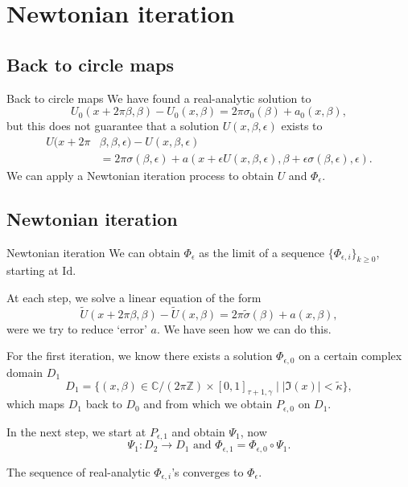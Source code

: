 \documentclass[]{beamer}
\newcommand{\e}{\epsilon}
\newcommand{\be}{\beta}
\newcommand{\g}{\gamma}
\begin{document}
\section{Newtonian iteration}

\subsection{Back to circle maps}

\begin{frame}{Back to circle maps}
    We have found a real-analytic solution to
    \begin{equation*}
        U_0(x + 2 \pi \be,\be) - U_0(x, \be)
        = 2 \pi \sigma_0(\be) + a_0(x, \be),
    \end{equation*}
    but this does not guarantee that a solution $U(x, \be, \e)$ exists to
    \begin{align*}
	    U(x + 2 \pi & \be,\be,\e) - U(x, \be, \e) \\
            & = 2 \pi \sigma(\be, \e) + a(x + \e U(x, \be, \e), \be + \e \sigma(\be, \e), \e).
    \end{align*}
    \pause
    We can apply a Newtonian iteration process to obtain $U$ and $\Phi_\e$.
    
\end{frame}

\subsection{Newtonian iteration}
\begin{frame}{Newtonian iteration}
    We can obtain $\Phi_\e$ as the limit of a sequence $\{ \Phi_{\e,i} \}_{k\ge0}$,
    starting at $\mathrm{Id}$.

\medskip
\pause
    At each step, we solve a linear equation of the form
\begin{equation*}
    \tilde U (x + 2\pi \be, \be) - \tilde U (x,\be) = 2 \pi \tilde \sigma(\be) + a(x, \be),
\end{equation*}
   were we try to reduce `error' $a$. We have seen how we can do this.
\end{frame}

\begin{frame}
    For the first iteration, we know there exists a solution $\Phi_{\e,0}$ on
    a certain complex domain $D_1$
    \begin{equation*}
        D_1 = \{ (x,\be) \in \mathbb{C}/(2 \pi \mathbb{Z}) \times [0,1]_{\tau +1, \g} \mid |\Im(x)| < \tilde \kappa \},
    \end{equation*}
     which maps $D_1$ back to $D_0$ and from which we obtain $P_{\e,0}$ on $D_1$.
     
\medskip
\pause
In the next step, we start at $P_{\e,1}$ and obtain $\Psi_1$, now
\begin{equation*}
    \Psi_1 : D_2 \rightarrow D_1 \text{ and } \Phi_{\e,1} = \Phi_{\e,0} \circ \Psi_{1}.
\end{equation*}

\pause

The sequence of real-analytic $\Phi_{\e, i}$'s converges to $\Phi_\e$.
\end{frame}
\end{document}
